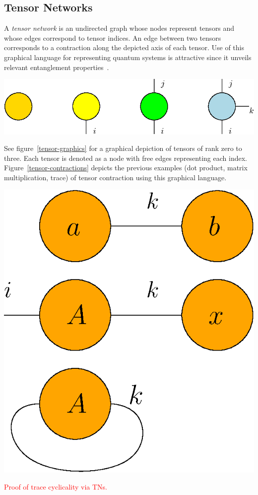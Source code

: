 \documentclass[12pt]{article}
\newenvironment{Figure}
  {\par\medskip\noindent\minipage{\linewidth}}
  {\endminipage\par\medskip}
\begin{document}
\begin{multicols}{2}
	\subsection*{Tensor Networks}
	A \textit{tensor network} is an undirected graph whose nodes represent tensors and whose edges correspond to tensor indices. An edge between two tensors corresponds to a contraction along the depicted axis of each tensor. Use of this graphical language for representing quantum systems is attractive since it unveils relevant entanglement properties~\cite{TnIntro}.
	\begin{Figure}
		\center\includegraphics[width=.9\textwidth]{./Figures/tensors.eps}
		\label{tensor-graphics}
	\end{Figure}
	See figure~\ref{tensor-graphics} for a graphical depiction of tensors of rank zero to three. Each tensor is denoted as a node with free edges representing each index.
	Figure~\ref{tensor-contractions} depicts the previous examples (dot product, matrix multiplication, trace) of tensor contraction using this graphical language.
	\begin{Figure}
		\center\includegraphics[width=.5\textwidth]{./Figures/contractions.eps}
		\label{tensor-contractions}
	\end{Figure}
	\textcolor{red}{Proof of trace cyclicality via TNs.}

\end{multicols}
\end{document}
